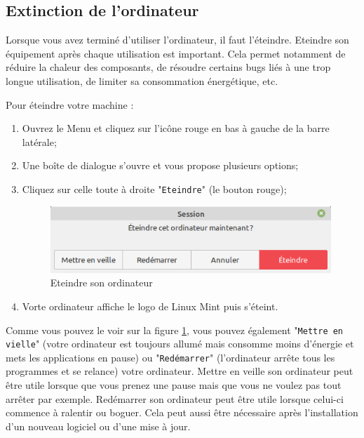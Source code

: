 \documentclass[12pt]{book}
\begin{document}
	\subsection{Extinction de l'ordinateur}
		Lorsque vous avez terminé d'utiliser l'ordinateur, il faut l'éteindre. Eteindre son équipement après chaque utilisation est important. 
		Cela permet notamment de réduire la chaleur des composants, de résoudre certains bugs liés à une trop longue utilisation, de limiter sa consommation énergétique, etc.\par
		Pour éteindre votre machine :
		\begin{enumerate}
			\item Ouvrez le Menu et cliquez sur l'icône rouge en bas à gauche de la barre latérale;
			\item Une boîte de dialogue s'ouvre et vous propose plusieurs options;
			\item Cliquez sur celle toute à droite "\texttt{Eteindre}" (le bouton rouge);
			\begin{figure}[h]
				\centering
				\includegraphics[width=.8\textwidth]{include/eteindre.png}
				\caption{Eteindre son ordinateur}
				\label{fig:eteindre}
			\end{figure}
			\item Vorte ordinateur affiche le logo de Linux Mint puis s'éteint.
		\end{enumerate}
		Comme vous pouvez le voir sur la figure \ref{fig:eteindre}, vous pouvez également "\texttt{Mettre en vielle}" (votre ordinateur est toujours allumé mais consomme moins d'énergie et mets les applications en pause) ou "\texttt{Redémarrer}" (l'ordinateur arrête tous les programmes et se relance) votre ordinateur.
		Mettre en veille son ordinateur peut être utile lorsque que vous prenez une pause mais que vous ne voulez pas tout arrêter par exemple.
		Redémarrer son ordinateur peut être utile lorsque celui-ci commence à ralentir ou boguer.
		Cela peut aussi être nécessaire après l'installation d'un nouveau logiciel ou d'une mise à jour.
\end{document}
